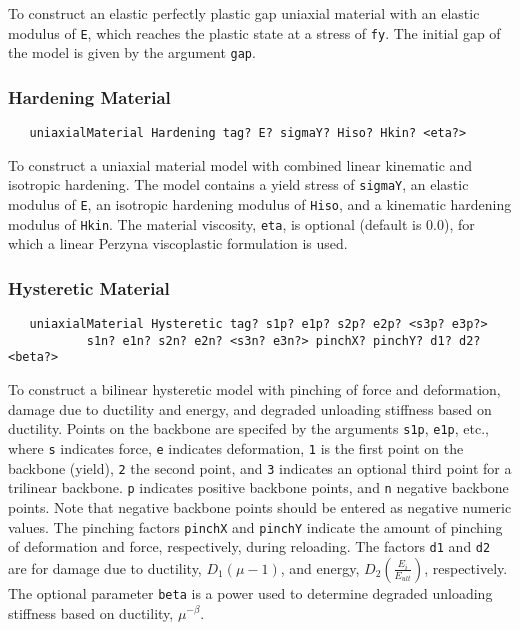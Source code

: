 \documentclass[12pt]{article}
\begin{document}
\noindent To construct an elastic perfectly plastic gap uniaxial material
with an elastic modulus of {\tt E}, which reaches the plastic state at a
stress of {\tt fy}. The initial gap of the model is given by the argument
{\tt gap}.

\subsubsection{Hardening Material}
{\sf\small
\begin{verbatim}
   uniaxialMaterial Hardening tag? E? sigmaY? Hiso? Hkin? <eta?>
\end{verbatim}
}

\noindent To construct a uniaxial material model with combined linear kinematic
and isotropic hardening. The model contains a yield stress of {\tt sigmaY}, an
elastic modulus of {\tt E}, an isotropic hardening modulus of {\tt Hiso},
and a kinematic hardening modulus of {\tt Hkin}. The material viscosity,
{\tt eta}, is optional (default is 0.0), for which a linear Perzyna
viscoplastic formulation is used.

\subsubsection{Hysteretic Material}
{\sf\small
\begin{verbatim}
   uniaxialMaterial Hysteretic tag? s1p? e1p? s2p? e2p? <s3p? e3p?>
           s1n? e1n? s2n? e2n? <s3n? e3n?> pinchX? pinchY? d1? d2? <beta?>
\end{verbatim}
}

\noindent To construct a bilinear hysteretic model with pinching of force and
deformation, damage due to ductility and energy, and degraded unloading 
stiffness based on ductility. Points on the backbone are specifed by the
arguments {\tt s1p}, {\tt e1p}, etc.,
where {\tt s} indicates force, {\tt e} indicates deformation,
{\tt 1} is the first point on the backbone (yield), {\tt 2} the second
point, and {\tt 3} indicates
an optional third point for a trilinear backbone. {\tt p} indicates
positive backbone
points, and {\tt n} negative backbone points.
Note that negative backbone points should be entered as negative numeric
values. The pinching factors {\tt pinchX} and
{\tt pinchY} indicate the amount of pinching of deformation and force,
respectively, during reloading. The factors {\tt d1} and {\tt d2}
are for damage due to ductility, $D_1(\mu-1)$, and energy,
$D_2(\frac{E_i}{E_{ult}})$, respectively. 
The optional parameter {\tt beta} is a power used to determine degraded
unloading stiffness based on ductility, $\mu^{-\beta}$.
\end{document}
